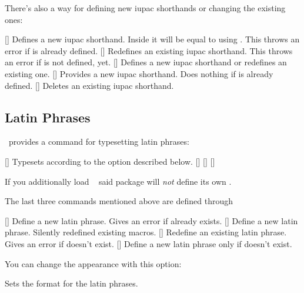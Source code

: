 \documentclass{chemmacros-manual}
\begin{document}
There's also a way for defining new \ac{iupac} shorthands or changing the
existing ones:
\begin{commands}
  []
    Defines a new \ac{iupac} shorthand.  Inside  it will be equal to
    using .  This throws an error if  is already defined.
  []
    Redefines an existing \ac{iupac} shorthand.  This throws an error if
     is not defined, yet.
  []
    Defines a new \ac{iupac} shorthand or redefines an existing one.
  []
    Provides a new \ac{iupac} shorthand.  Does nothing if  is already defined.
  []
    Deletes an existing \ac{iupac} shorthand.
\end{commands}

\subsection{Latin Phrases}

\chemmacros\ provides a command for typesetting latin phrases:
\begin{commands}
  []
    Typesets  according to the option  described
    below.
  [\quad\insitu]
  [\quad\invacuo]
  [\quad\abinitio]
\end{commands}

If you additionally load ~\cite{pkg:chemstyle} said package
will \emph{not} define its own .

The last three commands mentioned above are defined through
\begin{commands}
  []
    Define a new latin phrase.  Gives an error if  already exists.
  []
    Define a new latin phrase.  Silently redefined existing macros.
  []
    Redefine an existing latin phrase.  Gives an error if  doesn't
    exist.
  []
    Define a new latin phrase only if  doesn't exist.
\end{commands}
\begin{example}
  \NewChemLatin{}\ltn
\end{example}
You can change the appearance with this option:
\begin{options}
    Sets the format for the latin phrases.
\end{options}
\end{document}
